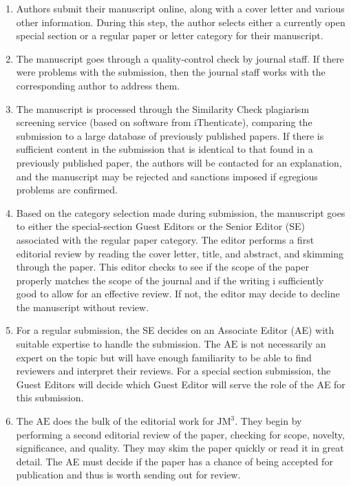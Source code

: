 \begin{enumerate}
  \item Authors submit their manuscript online, along with a cover letter and various other information. During this step, the author selects either a currently open special section or a regular paper or letter category for their manuscript.

  \item The manuscript goes through a quality-control check by journal staff. If there were problems with the submission, then the journal staff works with the corresponding author to address them.

  \item The manuscript is processed through the Similarity Check plagiarism screening service (based on software from iThenticate), comparing the submission to a large database of previously published papers. If there is sufficient content in the submission that is identical to that found in a previously published paper, the authors will be contacted for an explanation, and the manuscript may be rejected and sanctions imposed if egregious problems are confirmed.

  \item Based on the category selection made during submission, the manuscript goes to either the special-section Guest Editors or the Senior Editor (SE) associated with the regular paper category. The editor performs a first editorial review by reading the cover letter, title, and abstract, and skimming through the paper. This editor checks to see if the scope of the paper properly matches the scope of the journal and if the writing i sufficiently good to allow for an effective review. If not, the editor may decide to decline the manuscript without review.

  \item For a regular submission, the SE decides on an Associate Editor (AE) with suitable expertise to handle the submission. The $\mathrm{AE}$ is not necessarily an expert on the topic but will have enough familiarity to be able to find reviewers and interpret their reviews. For a special section submission, the Guest Editors will decide which Guest Editor will serve the role of the AE for this submission.

  \item The $\mathrm{AE}$ does the bulk of the editorial work for $\mathrm{JM}^{3}$. They begin by performing a second editorial review of the paper, checking for scope, novelty, significance, and quality. They may skim the paper quickly or read it in great detail. The AE must decide if the paper has a chance of being accepted for publication and thus is worth sending out for review.


\end{enumerate}
